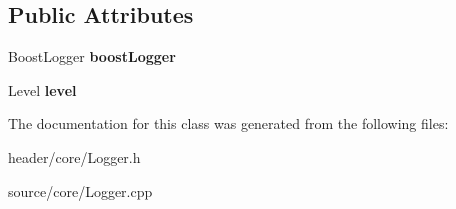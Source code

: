 \subsection*{Public Attributes}
\begin{DoxyCompactItemize}
\item 
\mbox{\label{classcore_1_1_logger_a07bd26ceeb0e9976e94460159236b2fe}} 
Boost\+Logger {\bfseries boost\+Logger}
\item 
\mbox{\label{classcore_1_1_logger_aa2b233cde04401ea77571eb17e24ac44}} 
Level {\bfseries level}
\end{DoxyCompactItemize}


The documentation for this class was generated from the following files\+:\begin{DoxyCompactItemize}
\item 
header/core/Logger.\+h\item 
source/core/Logger.\+cpp\end{DoxyCompactItemize}
